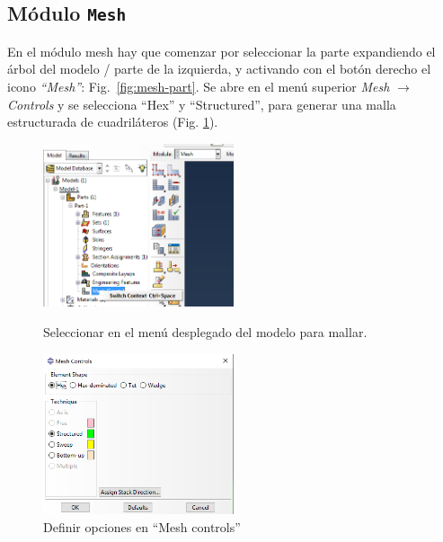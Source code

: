 \documentclass[spanish,a4paper,12pt]{article}
\begin{document}
\subsection{Módulo \texttt{Mesh}}
En el módulo mesh hay que comenzar por seleccionar la parte expandiendo el árbol del modelo / parte de la izquierda, y activando con el botón derecho el icono \emph{``Mesh''}:
Fig.~\ref{fig:mesh-part}.
Se abre en el menú superior \emph{Mesh} $\to$ \emph{Controls} y se selecciona ``Hex'' y ``Structured'', para generar una malla estructurada de cuadriláteros
(Fig. \ref{fig:mesh-controls}).
\begin{figure}[h!tp]
\parbox[t]{0.49\textwidth}{%
\includegraphics[width=0.5\textwidth]{capturas/29-mesh.png}
\caption{Seleccionar en el menú desplegado del modelo para mallar.}
\label{fig:mesh-part}%
}\quad
\parbox[t]{0.49\textwidth}{%
\includegraphics[width=0.5\textwidth]{capturas/30-mesh-x.png}
\caption{Definir opciones en ``Mesh controls''}
\label{fig:mesh-controls}%
}%
\end{figure}
\end{document}
